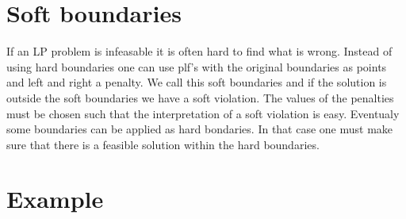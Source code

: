 \documentclass[]{article}
\begin{document}
\section{Soft boundaries}
If an LP problem is infeasable it is often hard to find what is wrong.
Instead of using hard boundaries one can use plf's with the original boundaries as points
and left and right a penalty.
We call this soft boundaries and if the solution is outside the soft boundaries
we have a soft violation.
The values of the penalties must be chosen such that the interpretation of a soft violation is easy.
Eventualy some boundaries can be applied as hard bondaries.
In that case one must make sure that there is a feasible solution within the hard boundaries.

\section{Example}
\newcommand{\ov}[1]{\overline{#1}}
\newcommand{\un}[1]{\underline{#1}}
\newcommand{\ster}[1]{\draw (#1) +(0:-0.2)--+( 0:0.2) +(60:-0.2)--+( 60:0.2) +( -60:-0.2)--+(-60:0.2);}
\newcommand{\voeding}[2]{
  \ster{#2:#1-1.5}
  \draw [<-] (#1,0) + (#2:-0.1) -- +(#2:-1.4);
}
\newcommand{\punt}[1]{ \fill (#1) circle[radius= 0.1,fill = red]; }          
\newcommand{\leiding}[2]{
   \punt{#1,0}
   \draw (#1,0) +(0.1,0) -- (#2-0.1,0);
   \punt{#2,0}
}
\newcommand{\compressor}[1]{
   \draw (#1+1,0) +(-0.9,0)--+(-0.5,0) +(0,0)circle[radius=0.5] 
   +(120:0.5)--+(30:0.5) +(-120:0.5)--+(-30:0.5)
   +(0.5,0)--+(0.9,0);
}
\newcommand{\reduceer}[1]{
   \draw (#1+1,0) +(-0.9,0)--+(-0.5,0)
    + (0.5,0.5)--+(-0.5,0.5)--+(-0.5,-0.5)--+(0.5,-0.5)--+ (0.5,0.5)
   +(0.5,0)--+(0.9,0);
   \draw[fill] (#1+1.5,0) -- +(-1,0.5) --+(-1,-0.5);
}
\newcommand{\afname}[2]{ \draw [->] (#1,0) +(#2:0.1) -- +(#2:1.4); }
\end{document}
